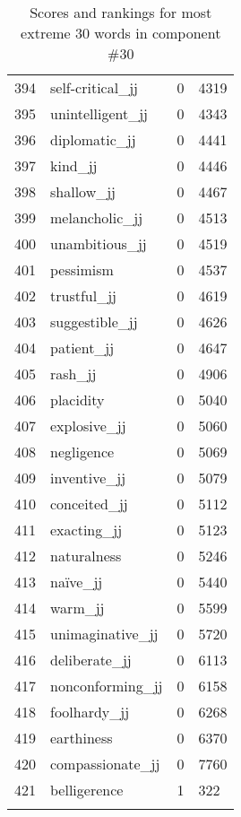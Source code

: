 \begin{longtable}[!htbp]{| rlr@{.}l |}
    394 & self-critical\_jj & 0 & 4319 \\
    395 & unintelligent\_jj & 0 & 4343 \\
    396 & diplomatic\_jj & 0 & 4441 \\
    397 & kind\_jj & 0 & 4446 \\
    398 & shallow\_jj & 0 & 4467 \\
    399 & melancholic\_jj & 0 & 4513 \\
    400 & unambitious\_jj & 0 & 4519 \\
    401 & pessimism & 0 & 4537 \\
    402 & trustful\_jj & 0 & 4619 \\
    403 & suggestible\_jj & 0 & 4626 \\
    404 & patient\_jj & 0 & 4647 \\
    405 & rash\_jj & 0 & 4906 \\
    406 & placidity & 0 & 5040 \\
    407 & explosive\_jj & 0 & 5060 \\
    408 & negligence & 0 & 5069 \\
    409 & inventive\_jj & 0 & 5079 \\
    410 & conceited\_jj & 0 & 5112 \\
    411 & exacting\_jj & 0 & 5123 \\
    412 & naturalness & 0 & 5246 \\
    413 & naïve\_jj & 0 & 5440 \\
    414 & warm\_jj & 0 & 5599 \\
    415 & unimaginative\_jj & 0 & 5720 \\
    416 & deliberate\_jj & 0 & 6113 \\
    417 & nonconforming\_jj & 0 & 6158 \\
    418 & foolhardy\_jj & 0 & 6268 \\
    419 & earthiness & 0 & 6370 \\
    420 & compassionate\_jj & 0 & 7760 \\
    421 & belligerence & 1 & 322 \\
    \hline
    \caption{Scores and rankings for most extreme 30 words in component \#30} \\
\end{longtable}
